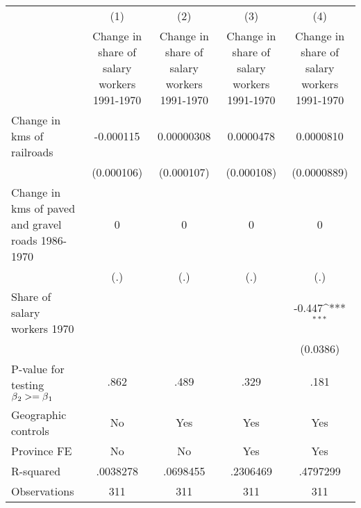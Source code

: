 {
\def\sym#1{\ifmmode^{#1}\else\(^{#1}\)\fi}
\begin{tabular}{l*{4}{c}}
\hline\hline
                &\multicolumn{1}{c}{(1)}&\multicolumn{1}{c}{(2)}&\multicolumn{1}{c}{(3)}&\multicolumn{1}{c}{(4)}\\
                &\multicolumn{1}{c}{Change in share of salary workers 1991-1970}&\multicolumn{1}{c}{Change in share of salary workers 1991-1970}&\multicolumn{1}{c}{Change in share of salary workers 1991-1970}&\multicolumn{1}{c}{Change in share of salary workers 1991-1970}\\
\hline
Change in kms of railroads&-0.000115         &0.00000308         &0.0000478         &0.0000810         \\
                &(0.000106)         &(0.000107)         &(0.000108)         &(0.0000889)         \\
[1em]
Change in kms of paved and gravel roads 1986-1970&        0         &        0         &        0         &        0         \\
                &      (.)         &      (.)         &      (.)         &      (.)         \\
[1em]
Share of salary workers 1970&                  &                  &                  &   -0.447\sym{***}\\
                &                  &                  &                  & (0.0386)         \\
\hline
P-value for testing $\beta\\_2 >= \beta\\_1$&     .862         &     .489         &     .329         &     .181         \\
Geographic controls&       No         &      Yes         &      Yes         &      Yes         \\
Province FE     &       No         &       No         &      Yes         &      Yes         \\
R-squared       & .0038278         & .0698455         & .2306469         & .4797299         \\
Observations    &      311         &      311         &      311         &      311         \\
\hline\hline
\end{tabular}
}
